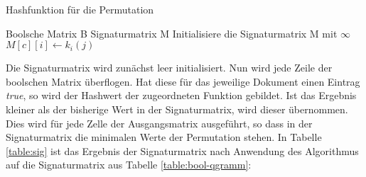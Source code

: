 \begin{algorithm}[H]
\caption{Hashfunktion für die Permutation}
\label{algorithm:minhash-permutation}
\begin{algorithmic}[1]
 \renewcommand{\algorithmicrequire}{\textbf{Eingabe:}}
 \renewcommand{\algorithmicensure}{\textbf{Ausgabe:}}
\REQUIRE Boolsche Matrix B
\ENSURE Signaturmatrix M
\STATE Initialisiere die Signaturmatrix M mit $\infty$
\STATE $M[c][i] \leftarrow k_i(j)$
\ENDIF
\ENDFOR
\ENDIF
\ENDFOR
\end{algorithmic}
\end{algorithm}
Die Signaturmatrix wird zunächst leer initialisiert. Nun wird jede Zeile der boolschen Matrix überflogen. Hat diese für das jeweilige Dokument einen Eintrag \textit{true}, so wird der Hashwert der zugeordneten Funktion gebildet. Ist das Ergebnis kleiner als der bisherige Wert in der Signaturmatrix, wird dieser übernommen. Dies wird für jede Zelle der Ausgangsmatrix ausgeführt, so dass in der Signaturmatrix die minimalen Werte der Permutation stehen. In Tabelle \ref{table:sig} ist das Ergebnis der Signaturmatrix nach Anwendung des Algorithmus auf die Signaturmatrix aus Tabelle \ref{table:bool-qgramm}:

